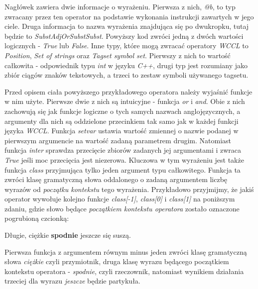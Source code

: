 \par
Nagłówek zawiera dwie informacje o wyrażeniu.
Pierwsza z nich, \emph{@b}, to typ zwracany przez ten operator na podstawie wykonania instrukcji zawartych w jego ciele. 
Druga informacja to nazwa wyrażenia znajdująca się po dwukropku, tutaj będzie to \emph{SubstAdjOrSubstSubst}.
Powyższy kod zwróci jedną z dwóch wartości logicznych - \emph{True} lub \emph{False}.
Inne typy, które mogą zwracać operatory \emph{WCCL} to \emph{Position}, \emph{Set of strings} oraz \emph{Tagset symbol set}.
Pierwszy z nich to wartość całkowita - odpowiednik typu \emph{int} w języku \emph{C++}, drugi typ jest rozumiany jako zbiór ciągów znaków tekstowych, a trzeci to zestaw symboli używanego tagsetu.

\par
Przed opisem ciała powyższego przykładowego operatora należy wyjaśnić funkcje w nim użyte.
Pierwsze dwie z nich są intuicyjne - funkcja \emph{or} i \emph{and}.
Obie z nich zachowują się jak funkcje logiczne o tych samych nazwach anglojęzycznych, a argumenty dla nich są oddzielone przecinkiem tak samo jak w każdej funkcji języka \emph{WCCL}.
Funkcja \emph{setvar} ustawia wartość zmiennej o nazwie podanej w pierwszym argumencie na wartość zadaną parametrem drugim.
Natomiast funkcja \emph{inter} sprawdza przecięcie zbiorów zadanych jej argumentami i zwraca \emph{True} jeśli moc przecięcia jest niezerowa.
Kluczowa w tym wyrażeniu jest także funkcja \emph{class} przyjmująca tylko jeden argument typu całkowitego.
Funkcja ta zwróci klasę gramatyczną słowa oddalonego o zadaną argumentem liczbę wyrazów od \emph{początku kontekstu} tego wyrażenia.
Przykładowo przyjmijmy, że jakiś operator wywołuje kolejno funkcje \emph{class[-1]}, \emph{class[0]} i \emph{class[1]} na poniższym zdaniu, gdzie słowo będące \emph{początkiem kontekstu operatora} zostało oznaczone pogrubioną czcionką:
\begin{center}
Długie, ciężkie \textbf{spodnie} jeszcze się suszą.
\end{center}
Pierwsza funkcja z argumentem równym minus jeden zwróci klasę gramatyczną słowa \emph{ciężkie} czyli przymiotnik, druga klasę wyrazu będącego początkiem kontekstu operatora - \emph{spodnie}, czyli rzeczownik, natomiast wynikiem działania trzeciej dla wyrazu \emph{jeszcze} będzie partykuła.


